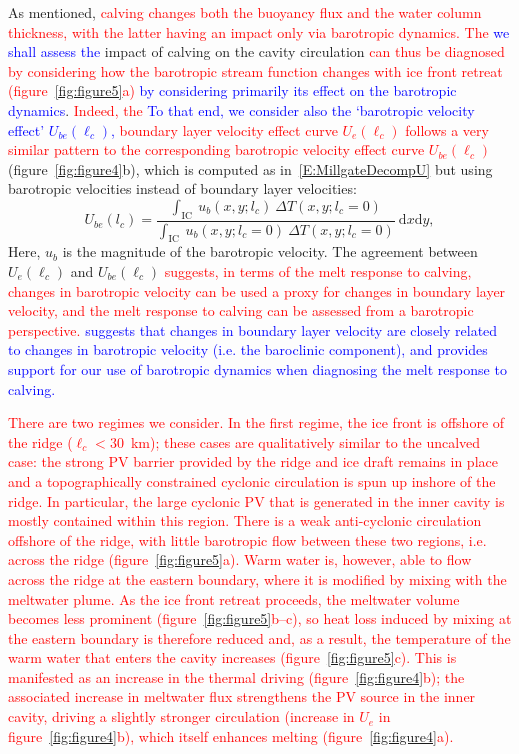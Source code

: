 \documentclass[draft]{agujournal2019}
\newcommand{\red}[1]{\textcolor{red}{#1}}
\newcommand{\blue}[1]{\textcolor{blue}{#1}}
\begin{document}
As mentioned, \red{calving changes both the buoyancy flux and the water column thickness, with the latter having an impact only via barotropic dynamics. The} \blue{we shall assess the} impact of calving on the cavity circulation \red{can thus be diagnosed by considering how the barotropic stream function changes with ice front retreat (figure~\ref{fig:figure5}a)} \blue{by considering primarily its effect on the barotropic dynamics}. \red{Indeed, the} \blue{To that end, we consider also the `barotropic velocity effect' $U_{be}(\ell_c)$, } \red{boundary layer velocity effect curve $U_e(\ell_c)$ follows a very similar pattern to the corresponding barotropic velocity effect curve $U_{be}(\ell_c)$} (figure~\ref{fig:figure4}b), which is computed as in~\eqref{E:MillgateDecompU} but using barotropic velocities instead of boundary layer velocities:
\begin{equation}\label{E:MillgateDecompUbaro}
    U_{be}(l_c)  =  \frac{\int_{\text{IC}}~u_b(x,y; l_c)~\Delta T(x,y;l_c = 0)}{\int_{\text{IC}}~ u_b(x,y; l_c = 0)~\Delta T(x,y;l_c = 0)}~\mathrm{d}x\mathrm{d}y,
\end{equation}
Here, $u_b$ is the magnitude of the barotropic velocity. The agreement between $U_e(\ell_c)$ and $U_{be}(\ell_c)$ \red{suggests, in terms of the melt response to calving, changes in barotropic velocity can be used a proxy for changes in boundary layer velocity, and the melt response to calving can be assessed from a barotropic perspective.} 
\blue{suggests that changes in boundary layer velocity are closely related to changes in barotropic velocity (i.e. the baroclinic component), and provides support for our use of barotropic dynamics when diagnosing the melt response to calving.}  %

\red{There are two regimes we consider. In the first regime, the ice front is offshore of the ridge ($\ell_c < 30$~km); these cases are qualitatively similar to the uncalved case: the strong PV barrier provided by the ridge and ice draft remains in place and a topographically constrained cyclonic circulation is spun up inshore of the ridge. In particular, the large cyclonic PV that is generated in the inner cavity is mostly contained within this region. There is a weak anti-cyclonic circulation offshore of the ridge, with little barotropic flow between these two regions, i.e. across the ridge (figure~\ref{fig:figure5}a). Warm water is, however, able to flow across the ridge at the eastern boundary, where it is modified by mixing with the meltwater plume. As the ice front retreat proceeds, the meltwater volume becomes less prominent (figure~\ref{fig:figure5}b--c), so heat loss induced by mixing at the eastern boundary is therefore reduced and, as a result, the temperature of the warm water that enters the cavity increases (figure~\ref{fig:figure5}c). This is manifested as an increase in the thermal driving (figure~\ref{fig:figure4}b); the associated increase in meltwater flux strengthens the PV source in the inner cavity, driving a slightly stronger circulation (increase in $U_e$ in figure~\ref{fig:figure4}b), which itself enhances melting (figure~\ref{fig:figure4}a).}
\end{document}
